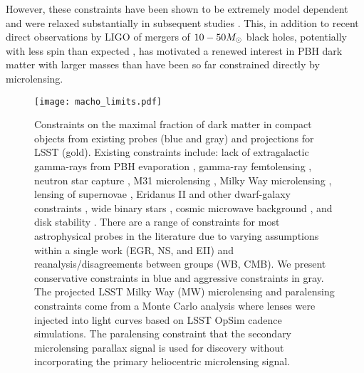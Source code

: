 However, these constraints have been shown to be extremely model dependent and were relaxed substantially in subsequent studies \citep{2017PhRvD..95d3534A}.
This, in addition to recent direct observations by LIGO of mergers of $10-50 M_\odot$ black holes, potentially with less spin than expected \citep{1602.03837, LIGOScientific:2018b, LIGOScientific:2018a},
has motivated a renewed interest in PBH dark matter with larger masses than have been so far constrained directly by microlensing.

\begin{figure}[t]
\centering
\texttt{[image: macho\_limits.pdf]}
\caption{\label{fig:macho_constraints}
    Constraints on the maximal fraction of dark matter in compact objects from existing probes (blue and gray) and projections for LSST (gold).
    Existing constraints include: lack of extragalactic gamma-rays from PBH evaporation \citep[EGR;][]{0912.5297, 1604.05349}, gamma-ray femtolensing \citep[GF;][]{1204.2056}, neutron star capture \citep[NS][]{1301.4984}, M31 microlensing \citep[M31ML][]{1701.02151}, Milky Way microlensing \citep[MWML;][]{2007A&A...469..387T, 2001ApJ...550L.169A, 2009MNRAS.397.1228W}, lensing of supernovae \citep[LSN;][]{1712.02240,1712.06574}, Eridanus II and other dwarf-galaxy constraints \citep[EII;][]{2016ApJ...824L..31B, 1611.05052}, wide binary stars \citep[WB;][]{2009MNRAS.396L..11Q, 2004ApJ...601..311Y}, cosmic microwave background \citep[CMB;][]{2017PhRvD..95d3534A, 2008ApJ...680..829R}, and disk stability \citep[DS;][]{1985ApJ...299..633L, 1994ApJ...437..184X}.
    There are a range of constraints for most astrophysical probes in the literature due to varying assumptions within a single work (EGR, NS, and EII) and reanalysis/disagreements between groups (WB, CMB).
    We present  conservative constraints in blue and  aggressive constraints in gray.
    The projected LSST Milky Way (MW) microlensing and paralensing constraints come from a Monte Carlo analysis where lenses were injected into light curves based on LSST OpSim cadence simulations. 
    The paralensing constraint  that the secondary microlensing parallax signal is used for discovery without incorporating the primary heliocentric microlensing signal.
}
\end{figure}

